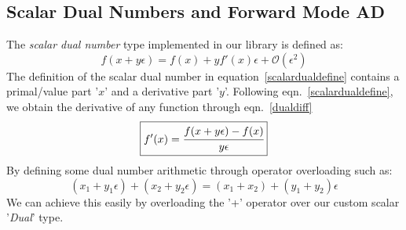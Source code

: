 \documentclass[12pt]{article}
\begin{document}
%

\subsection{Scalar Dual Numbers and Forward Mode AD}
The \emph{scalar dual number} type implemented in our library is defined as: 
\begin{equation}
	\boxed{
		f(x + y\epsilon) = f(x) + yf'(x)\epsilon + \mathcal{O}(\epsilon^{2})
}
	\label{scalardualdefine}
\end{equation}
The definition of the scalar dual number in equation~\ref{scalardualdefine}
contains a primal/value part '$x$' and a derivative part '$y$'.
Following eqn.~\ref{scalardualdefine}, we obtain 
the derivative of any function through eqn.~\ref{dualdiff}
\begin{equation}
	\boxed{
	f'(x) = \cfrac{f(x+y\epsilon) - f(x)}{y\epsilon}
}
	\label{dualdiff}
\end{equation}
By defining some dual number arithmetic through operator overloading 
such as: 
\begin{equation}
	\boxed{
	(x_{1}+y_{1}\epsilon) + (x_{2}+y_{2}\epsilon) = (x_{1}+x_{2}) + (y_{1}+y_{2})\epsilon
}
	\label{dualadd}
\end{equation}
We can achieve this easily by overloading the '+' operator over 
our custom scalar '\emph{Dual}' type. 
\\
\end{document}
